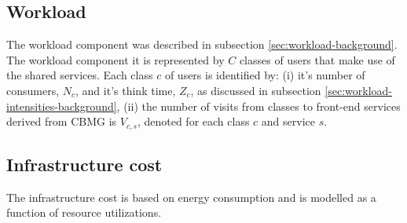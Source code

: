 \subsection{Workload} The workload component was described in subsection \ref{sec:workload-background}. The workload component it is represented by $C$ classes of users that make use of the shared services. Each class $c$ of users is identified by: (i) it's number of consumers, $N_c$, and it's think time, $Z_c$, as discussed in subsection \ref{sec:workload-intensities-background},  (ii) the number of visits from classes to front-end services derived from CBMG is $V_{c,s}$, denoted for each class $c$ and service $s$.   

\subsection{Infrastructure cost} The infrastructure cost is  based on energy consumption  and is modelled as a function of resource utilizations. 
   
